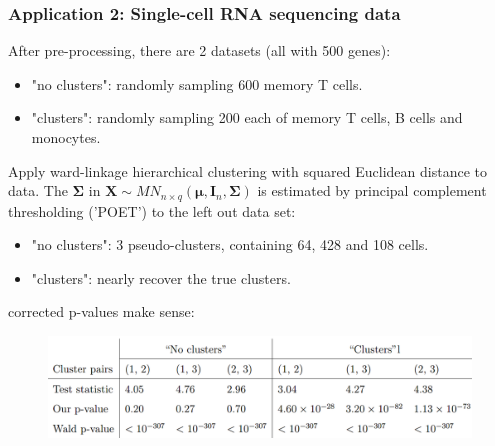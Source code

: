 \documentclass{beamer}
\begin{document}
	
	\begin{frame}
		\frametitle{Application 2: Single-cell RNA sequencing data}
		After pre-processing, there are 2 datasets (all with 500 genes):
		\begin{itemize}
			\item
			"no clusters": randomly sampling 600 memory T cells.
			\item
			"clusters": randomly sampling 200 each of memory T cells, B cells and monocytes. 
		\end{itemize}
		Apply ward-linkage hierarchical clustering with squared Euclidean distance to data. The $\bm{\Sigma}$ in $\bm{X}\sim MN_{n\times q}(\bm{\mu}, \bm{I}_n, \bm{\Sigma})$  is estimated by principal complement thresholding ('POET') to the left out data set:
		\begin{itemize}
			\item
			"no clusters": 3 pseudo-clusters, containing 64, 428 and 108 cells.
			\item
			"clusters": nearly recover the true clusters.
		\end{itemize}
		corrected p-values make sense:
		\begin{figure}
			\includegraphics[width=.8\linewidth]{image031.png}
		\end{figure}
	\end{frame}
	
\end{document}
